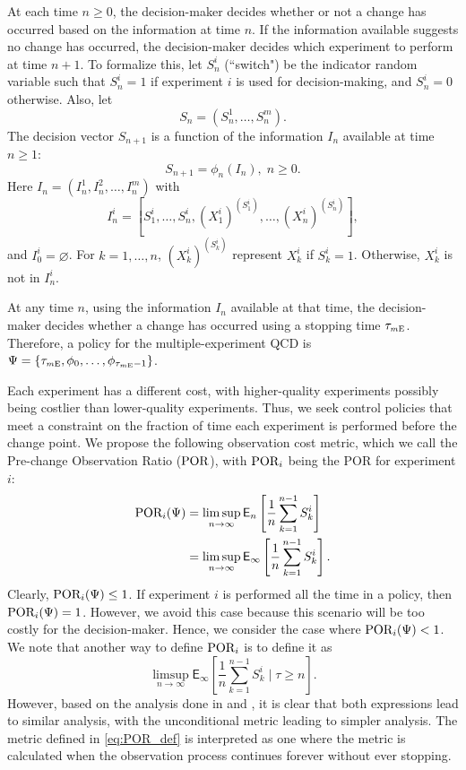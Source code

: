 \documentclass[journal, onecolumn]{IEEEtran}
\begin{document}
At each time $n \geq 0$, the decision-maker decides whether or not a change has occurred based on the information at time $n$. If the information available suggests no change has occurred, the decision-maker decides which experiment to perform at time $n + 1$. To formalize this, let $S_n^i$ (``switch") be the indicator random variable such that $S_n^i = 1$ if experiment $i$ is used for decision-making, and $S_n^i = 0$ otherwise. Also, let
$$ S_n = (S_n^1, \dots, S_n^m). $$ 
The decision vector $S_{n + 1}$ is a function of the information $I_n$
available at time $n \geq 1$:
\begin{equation} 
S_{n+1} = \phi_n(I_n), \; n \geq 0. 
\end{equation}
Here $I_n = (I_n^1, I_n^2, \dots, I_n^m)$ with 
$$ I_n^i = \left[ S_1^i, \dots, S_n^i, (X_1^i)^{(S_1^i)}, \dots, (X_n^i)^{(S_n^i)} \right], $$
and $I_0^i = \varnothing$. For $k = 1, \dots, n$, $(X_k^i)^{(S_k^i)}$ represent $X_k^i$ if $S_k^i = 1$. Otherwise, $X_k^i$ is not in $I_n^i$. 

At any time $n$, using the information $I_n$ available at that time, the decision-maker decides whether a change has occurred using a stopping time $\tau_{\textup{\fontsize{6 pt}{10 pt}\selectfont $m$E}}$. Therefore, a policy for the multiple-experiment QCD is $\Psi = \{ \tau_{\textup{\fontsize{6 pt}{10 pt}\selectfont $m$E}}, \phi_0, \dots, \phi_{\tau_{\text{$m$E}} - 1} \}$.

Each experiment has a different cost, with higher-quality experiments possibly being costlier than lower-quality experiments. Thus, we seek control policies that meet a constraint on the fraction of time each experiment is performed before the change point. We propose the following observation cost metric, which we call the Pre-change Observation Ratio ($\textup{POR}$), with $\textup{POR}_i$ being the POR for experiment $i$:
\begin{equation} 
\label{eq:POR_def}
\begin{split}
\textup{POR}_i (\Psi)
& = \limsup_{n \to \infty} \mathsf{E}_n \left[ \frac{1}{n} \sum_{k = 1}^{n - 1} S_k^i\right] \\
& = \limsup_{n \to \infty} \mathsf{E}_\infty \left[ \frac{1}{n} \sum_{k = 1}^{n - 1} S_k^i\right].
\end{split}
\end{equation}
Clearly, $\textup{POR}_i (\Psi) \leq 1$. If experiment $i$ is performed all the time in a policy, then $\textup{POR}_i (\Psi) = 1$. However, we avoid this case because this scenario will be too costly for the decision-maker. Hence, we consider the case where $\textup{POR}_i (\Psi) < 1$. We note that another way to define $\textup{POR}_i$ is to define it as
$$ \limsup_{n \to \infty} \mathsf{E}_\infty \left[ \frac{1}{n} \sum_{k = 1}^{n - 1} S_k^i \; \Bigg\vert \; \tau \geq n \right]. $$
However, based on the analysis done in \cite{banerjee2013} and \cite{banerjee2015}, it is clear that both expressions lead to similar analysis, with the unconditional metric leading to simpler analysis. The metric defined in \eqref{eq:POR_def} is interpreted as one where the metric is calculated when the observation process continues forever without ever stopping. 
\end{document}
